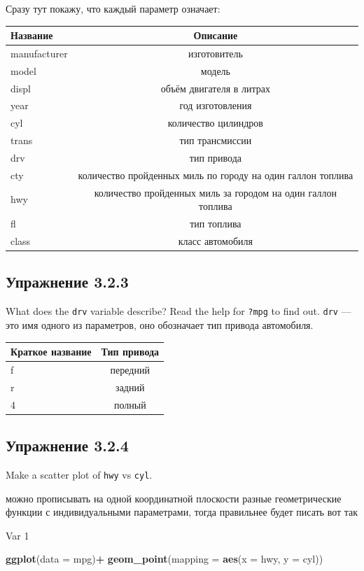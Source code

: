 \documentclass[]{book}
\newenvironment{Shaded}{\begin{snugshade}}{\end{snugshade}}
\newcommand{\KeywordTok}[1]{\textcolor[rgb]{0.13,0.29,0.53}{\textbf{#1}}}
\newcommand{\DataTypeTok}[1]{\textcolor[rgb]{0.13,0.29,0.53}{#1}}
\newcommand{\StringTok}[1]{\textcolor[rgb]{0.31,0.60,0.02}{#1}}
\newcommand{\OperatorTok}[1]{\textcolor[rgb]{0.81,0.36,0.00}{\textbf{#1}}}
\newcommand{\NormalTok}[1]{#1}
\begin{document}
Сразу тут покажу, что каждый параметр означает:

\begin{longtable}[]{@{}lc@{}}
\toprule
Название & Описание\tabularnewline
\midrule
\endhead
manufacturer & изготовитель\tabularnewline
model & модель\tabularnewline
displ & объём двигателя в литрах\tabularnewline
year & год изготовления\tabularnewline
cyl & количество цилиндров\tabularnewline
trans & тип трансмиссии\tabularnewline
drv & тип привода\tabularnewline
cty & количество пройденных миль по городу на один галлон
топлива\tabularnewline
hwy & количество пройденных миль за городом на один галлон
топлива\tabularnewline
fl & тип топлива\tabularnewline
class & класс автомобиля\tabularnewline
\bottomrule
\end{longtable}

\subsection*{Упражнение 3.2.3}\label{-3.2.3}

What does the \texttt{drv} variable describe? Read the help for
\texttt{?mpg} to find out. \texttt{drv} --- это имя одного из
параметров, оно обозначает тип привода автомобиля.

\begin{longtable}[]{@{}lc@{}}
\toprule
Краткое название & Тип привода\tabularnewline
\midrule
\endhead
f & передний\tabularnewline
r & задний\tabularnewline
4 & полный\tabularnewline
\bottomrule
\end{longtable}

\subsection*{Упражнение 3.2.4}\label{-3.2.4}

Make a scatter plot of \texttt{hwy} vs \texttt{cyl}.

можно прописывать на одной координатной плоскости разные геометрические
функции с индивидуальными параметрами, тогда правильнее будет писать вот
так

Var 1

\begin{Shaded}
\begin{Highlighting}[]
\KeywordTok{ggplot}\NormalTok{(}\DataTypeTok{data =}\NormalTok{ mpg)}\OperatorTok{+}
\StringTok{  }\KeywordTok{geom_point}\NormalTok{(}\DataTypeTok{mapping =} \KeywordTok{aes}\NormalTok{(}\DataTypeTok{x =}\NormalTok{ hwy, }\DataTypeTok{y =}\NormalTok{ cyl))}
\end{Highlighting}
\end{Shaded}
\end{document}
